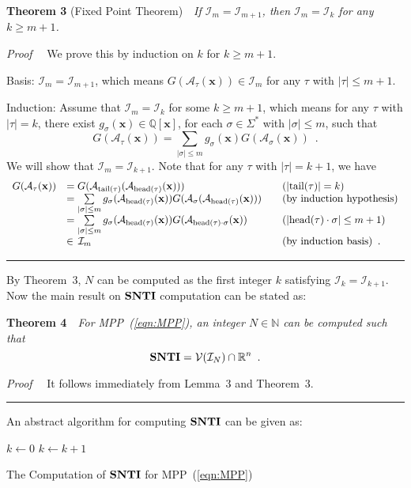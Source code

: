 \documentclass{article}
\newcommand{\rulex}{\hfill\rule{1mm}{3mm}}
\newcommand{\head}{{\rm head}}
\newcommand{\tail}{{\rm tail}}
\newcommand{\A}{\mathcal{A}}
\newcommand{\I}{\mathcal{I}}
\newcommand{\V}{\mathcal{V}}
\newcommand{\xx}{\mathbf{x}}
\newcommand{\SNTI}{{\bf SNTI}}
\begin{document}
{\bf Theorem 3} (Fixed Point Theorem)~~{\it If $\I_m=\I_{m+1}$, then $\I_m=\I_k$ for any $k \geq m+1$.}

{\it Proof}~~ We prove this by induction on $k$ for $k \geq m+1$.

Basis: $\I_m=\I_{m+1}$, which means $G(\A_{\tau}(\xx)) \in \I_m$ for any $\tau$ with $|\tau| \leq m+1$.

Induction: Assume that $\I_m = \I_k$ for some $k \geq m+1$, which means for any $\tau$ with $|\tau|=k$, there exist $g_{\sigma}(\xx) \in \mathbb{Q}[\xx]$, for each $\sigma \in \Sigma^*$ with $|\sigma| \leq m$, such that
\[
G(\A_{\tau}(\xx))=\sum_{|\sigma| \leq m} g_{\sigma}(\xx) G(\A_{\sigma}(\xx)) \enspace .
\]
We will show that $\I_m = \I_{k+1}$. Note that for any $\tau$ with $|\tau|=k+1$, we have
\[
\begin{array}{lll}
G(\A_{\tau}(\xx)) & = G(\A_{\tail(\tau)}(\A_{\head(\tau)}(\xx))) & \quad(|\tail(\tau)|=k) \\
& = \sum\limits_{|\sigma|\leq m} g_{\sigma}(\A_{\head(\tau)}(\xx)) G(\A_{\sigma}(\A_{\head(\tau)}(\xx))) & \quad \mbox{(by induction hypothesis)} \\
& = \sum\limits_{|\sigma|\leq m} g_{\sigma}(\A_{\head(\tau)}(\xx)) G(\A_{\head(\tau)\cdot\sigma}(\xx)) & \quad (|\head(\tau) \cdot \sigma| \leq m+1) \\
& \in \,\I_m & \quad (\mbox{by induction basis}) \enspace .
\end{array}
\]
\rulex

By Theorem~3, $N$ can be computed as the first integer $k$ satisfying $\I_k=\I_{k+1}$. Now the main result on $\SNTI$ computation can be stated as:

{\bf Theorem 4}~~{\it For MPP~(\ref{eqn:MPP}), an integer $N \in \mathbb{N}$ can be computed such that
\[
\SNTI=\V(\I_N) \cap \mathbb{R}^n \enspace .
\]}

{\it Proof}~~ It follows immediately from Lemma~3 and Theorem~3. \rulex

An abstract algorithm for computing $\SNTI$ can be given as:
\begin{algorithm}\label{alg:snt}
$k \leftarrow 0$\;
\While{$\I_{k} \neq \I_{k+1}$}
    {$k \leftarrow k+1$\;}
    {\KwRet{$\V(\I_k) \cap \mathbb{R}^n$}\;}
\caption{The Computation of $\SNTI$ for MPP~(\ref{eqn:MPP})}
\end{algorithm}
\end{document}
